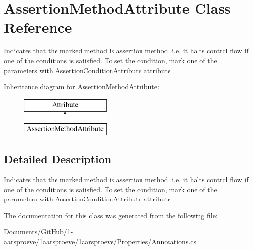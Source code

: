 \hypertarget{class_assertion_method_attribute}{}\section{Assertion\+Method\+Attribute Class Reference}
\label{class_assertion_method_attribute}


Indicates that the marked method is assertion method, i.\+e. it halts control flow if one of the conditions is satisfied. To set the condition, mark one of the parameters with \hyperlink{class_assertion_condition_attribute}{Assertion\+Condition\+Attribute} attribute  


Inheritance diagram for Assertion\+Method\+Attribute\+:\begin{figure}[H]
\begin{center}
\leavevmode
\includegraphics[height=2.000000cm]{class_assertion_method_attribute}
\end{center}
\end{figure}


\subsection{Detailed Description}
Indicates that the marked method is assertion method, i.\+e. it halts control flow if one of the conditions is satisfied. To set the condition, mark one of the parameters with \hyperlink{class_assertion_condition_attribute}{Assertion\+Condition\+Attribute} attribute 



The documentation for this class was generated from the following file\+:\begin{DoxyCompactItemize}
\item 
Documents/\+Git\+Hub/1-\/aarsproeve/1aarsproeve/1aarsproeve/\+Properties/Annotations.\+cs\end{DoxyCompactItemize}
